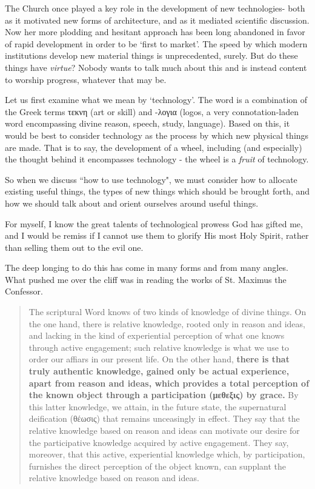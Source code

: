 \documentclass[letterpaper]{article}
\begin{document}

The Church once played a key role in the development of new technologies- both as it motivated new forms of architecture, and as it mediated scientific discussion. Now her more plodding and hesitant approach has been long abandoned in favor of rapid development in order to be `first to market'. The speed by which modern institutions develop new material things is unprecedented, surely. But do these things have \textit{virtue}? Nobody wants to talk much about this and is instead content to worship progress, whatever that may be.

Let us first examine what we mean by `technology'. The word is a combination of the Greek terms τεκνη (art or skill) and -λογια (logos, a very connotation-laden word encompassing divine reason, speech, study, language). Based on this, it would be best to consider technology as the process by which new physical things are made. That is to say, the development of a wheel, including (and especially) the thought behind it encompasses technology - the wheel is a \textit{fruit} of technology.

So when we discuss ``how to use technology", we must consider how to allocate existing useful things, the types of new things which should be brought forth, and how we should talk about and orient ourselves around useful things. 

For myself, I know the great talents of technological prowess God has gifted me, and I would be remiss if I cannot use them to glorify His most Holy Spirit, rather than selling them out to the evil one.

The deep longing to do this has come in many forms and from many angles. What pushed me over the cliff was in reading the works of St. Maximus the Confessor.

\begin{quote}
  The scriptural Word knows of two kinds of knowledge of divine things. On the one hand, there is relative knowledge, rooted only in reason and ideas, and lacking in the kind of experiential perception of what one knows through active engagement; such relative knowledge is what we use to order our affiars in our present life. On the other hand, \textbf{there is that truly authentic knowledge, gained only be actual experience, apart from reason and ideas, which provides a total perception of the known object through a participation (μεθεξις) by grace.} By this latter knowledge, we attain, in the future state, the supernatural deification (θέωσις) that remains unceasingly in effect. They say that the relative knowledge based on reason and ideas can motivate our desire for the participative knowledge acquired by active engagement. They say, moreover, that this active, experiential knowledge which, by participation, furnishes the direct perception of the object known, can supplant the relative knowledge based on reason and ideas.
\end{quote}
\end{document}
